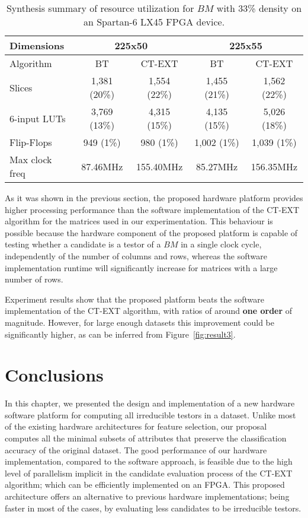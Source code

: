 \documentclass[letterpaper, twoside, openright, 12pt]{book}%
\begin{document}
	\begin{table}[htb]
	\caption{Synthesis summary of resource utilization for $BM$ with 33\% density on an Spartan-6 LX45 FPGA device.} \label{table:7}
	\begin{center}
	    \begin{tabular}{lcccc}   \hline
	    	    Dimensions & \multicolumn{2}{c}{225x50} & \multicolumn{2}{c}{225x55} \\ \hline
	    	    Algorithm & BT & CT-EXT & BT & CT-EXT \\ \hline 
	        Slices & 1,381 (20\%) & 1,554 (22\%) & 1,455 (21\%) & 1,562 (22\%) \\
	        6-input LUTs & 3,769 (13\%) & 4,315 (15\%) & 4,135 (15\%) & 5,026 (18\%)\\
	        Flip-Flops & 949 (1\%) & 980 (1\%) & 1,002 (1\%) & 1,039 (1\%)\\
	        Max clock freq & 87.46MHz & 155.40MHz & 85.27MHz & 156.35MHz\\ \hline
	    \end{tabular}
	\end{center}
	\end{table}
	
	As it was shown in the previous section, the proposed hardware platform provides higher processing performance than the software implementation of the CT-EXT algorithm for the matrices used in our experimentation. This behaviour is possible because the hardware component of the proposed platform is capable of testing whether a candidate is a testor of a $BM$ in a single clock cycle, independently of the number of columns and rows, whereas the software implementation runtime will significantly increase for matrices with a large number of rows.
	
	Experiment results show that the proposed platform beats the software implementation of the CT-EXT algorithm, with ratios of around \textbf{one order} of magnitude. However, for large enough datasets this improvement could be significantly higher, as can be inferred from Figure~\ref{fig:result3}.

%	
\section{Conclusions} \label{sec:conlusionsHardware}
%

	In this chapter, we presented the design and implementation of a new hardware software platform for computing all irreducible testors in a dataset.  Unlike most of the existing hardware architectures for feature selection, our proposal computes all the minimal subsets of attributes that preserve the classification accuracy of the original dataset. The good performance of our hardware implementation, compared to the software approach, is feasible due to the high level of parallelism implicit in the candidate evaluation process of the CT-EXT algorithm; which can be efficiently implemented on an FPGA. This proposed architecture offers an alternative to previous hardware implementations; being faster in most of the cases, by evaluating less candidates to be irreducible testors. 
	
\end{document}
